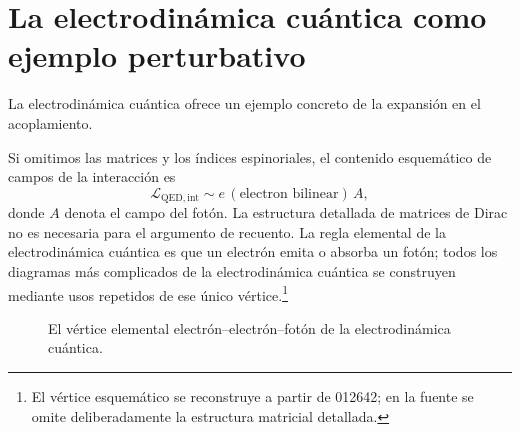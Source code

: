 \section{La electrodinámica cuántica como ejemplo perturbativo}

La electrodinámica cuántica ofrece un ejemplo concreto de la expansión en el acoplamiento.

\begin{classroomqa}\end{classroomqa}

Si omitimos las matrices y los índices espinoriales, el contenido esquemático de campos de la interacción es
\begin{equation}
\mathcal{L}_{\mathrm{QED,int}}
\sim e\,(\text{electron bilinear})\,A,
\end{equation}
donde \(A\) denota el campo del fotón. La estructura detallada de matrices de Dirac no es necesaria para el argumento de recuento. La regla elemental de la electrodinámica cuántica es que un electrón emita o absorba un fotón; todos los diagramas más complicados de la electrodinámica cuántica se construyen mediante usos repetidos de ese único vértice.\footnote{El vértice esquemático se reconstruye a partir de 012642; en la fuente se omite deliberadamente la estructura matricial detallada.}

\begin{figure}[htbp]\centering
{}\caption{El vértice elemental electrón--electrón--fotón de la electrodinámica cuántica.}\end{figure}

\begin{classroomqa}\end{classroomqa}

